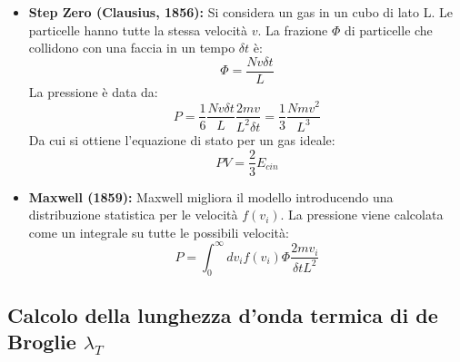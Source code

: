\begin{itemize}
    \item \textbf{Step Zero (Clausius, 1856):} Si considera un gas in un cubo di lato L. Le particelle hanno tutte la stessa velocità $v$. La frazione $\Phi$ di particelle che collidono con una faccia in un tempo $\delta t$ è:
    \begin{equation}
        \Phi = \frac{N v \delta t}{L}
        \label{eq:clausius_phi}
    \end{equation}
    La pressione è data da:
    \begin{equation}
        P=\frac{1}{6} \frac{N v \delta t}{L} \frac{2mv}{L^2 \delta t} = \frac{1}{3} \frac{Nmv^2}{L^3}
        \label{eq:clausius_p}
    \end{equation}
    Da cui si ottiene l'equazione di stato per un gas ideale:
    \begin{equation}
        PV=\frac{2}{3}E_{cin}
        \label{eq:gas_ideale}
    \end{equation}
    
    \item \textbf{Maxwell (1859):} Maxwell migliora il modello introducendo una distribuzione statistica per le velocità $f(v_i)$. La pressione viene calcolata come un integrale su tutte le possibili velocità:
    \begin{equation}
        P=\int_{0}^{\infty}dv_{i}f(v_{i})\Phi\frac{2mv_{i}}{\delta tL^{2}}
        \label{eq:maxwell_p}
    \end{equation}
\end{itemize}

\subsection*{Calcolo della lunghezza d'onda termica di de Broglie $\lambda_T$}

